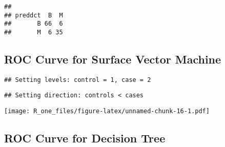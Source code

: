 \documentclass[]{article}
\newenvironment{Shaded}{\begin{snugshade}}{\end{snugshade}}
\newcommand{\DataTypeTok}[1]{\textcolor[rgb]{0.13,0.29,0.53}{#1}}
\newcommand{\KeywordTok}[1]{\textcolor[rgb]{0.13,0.29,0.53}{\textbf{#1}}}
\newcommand{\NormalTok}[1]{#1}
\newcommand{\OperatorTok}[1]{\textcolor[rgb]{0.81,0.36,0.00}{\textbf{#1}}}
\newcommand{\OtherTok}[1]{\textcolor[rgb]{0.56,0.35,0.01}{#1}}
\newcommand{\StringTok}[1]{\textcolor[rgb]{0.31,0.60,0.02}{#1}}
\begin{document}
\begin{verbatim}
##        
## preddct  B  M
##       B 66  6
##       M  6 35
\end{verbatim}

\hypertarget{roc-curve-for-surface-vector-machine}{%
\subsection{ROC Curve for Surface Vector
Machine}\label{roc-curve-for-surface-vector-machine}}

\begin{Shaded}
\end{Shaded}

\begin{verbatim}
## Setting levels: control = 1, case = 2
\end{verbatim}

\begin{verbatim}
## Setting direction: controls < cases
\end{verbatim}

\texttt{[image: R\_one\_files/figure-latex/unnamed-chunk-16-1.pdf]}

\hypertarget{roc-curve-for-decision-tree}{%
\subsection{ROC Curve for Decision
Tree}\label{roc-curve-for-decision-tree}}
\end{document}
